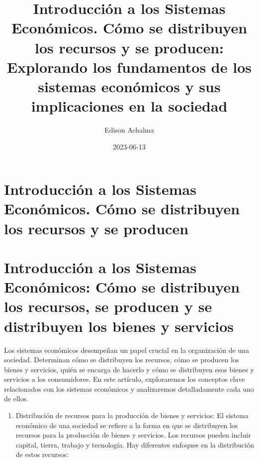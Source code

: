 \documentclass[
  man,
  floatsintext,
  longtable,
  a4paper,
  nolmodern,
  notxfonts,
  notimes,
  colorlinks=true,linkcolor=blue,citecolor=blue,urlcolor=blue]{apa7}
\title{Introducción a los Sistemas Económicos. Cómo se distribuyen los
recursos y se producen: Explorando los fundamentos de los sistemas
económicos y sus implicaciones en la sociedad}
\author{Edison Achalma}
\affiliation{
{Escuela Profesional de Economía, Universidad Nacional de San Cristóbal
de Huamanga}}
\date{2023-06-13}
\providecommand{\tightlist}{%
  \setlength{\itemsep}{0pt}\setlength{\parskip}{0pt}}
\begin{document}
\maketitle

\hypertarget{toc}{}
\tableofcontents
\newpage
\section[Introduction]{Introducción a los Sistemas Económicos. Cómo se
distribuyen los recursos y se producen}

\setcounter{secnumdepth}{-\maxdimen} %

\setlength\LTleft{0pt}


\section{Introducción a los Sistemas Económicos: Cómo se distribuyen los
recursos, se producen y se distribuyen los bienes y
servicios}\label{introducciuxf3n-a-los-sistemas-econuxf3micos-cuxf3mo-se-distribuyen-los-recursos-se-producen-y-se-distribuyen-los-bienes-y-servicios}

Los sistemas económicos desempeñan un papel crucial en la organización
de una sociedad. Determinan cómo se distribuyen los recursos, cómo se
producen los bienes y servicios, quién se encarga de hacerlo y cómo se
distribuyen esos bienes y servicios a los consumidores. En este
artículo, exploraremos los conceptos clave relacionados con los sistemas
económicos y analizaremos detalladamente cada uno de ellos.

\begin{enumerate}
\def\labelenumi{\arabic{enumi}.}
\tightlist
\item
  Distribución de recursos para la producción de bienes y servicios: El
  sistema económico de una sociedad se refiere a la forma en que se
  distribuyen los recursos para la producción de bienes y servicios. Los
  recursos pueden incluir capital, tierra, trabajo y tecnología. Hay
  diferentes enfoques en la distribución de estos recursos:
\end{enumerate}
\end{document}
